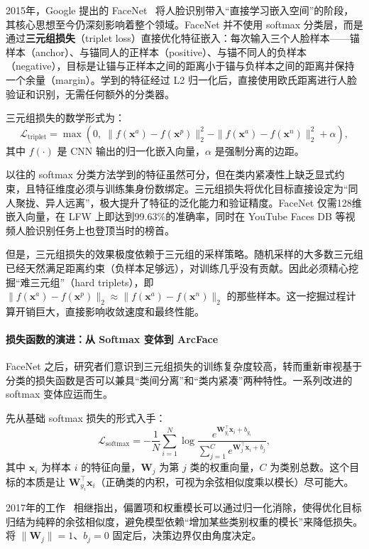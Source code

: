 2015年，Google 提出的 FaceNet~\cite{Schroff_2015} 将人脸识别带入“直接学习嵌入空间”的阶段，其核心思想至今仍深刻影响着整个领域。FaceNet 并不使用 softmax 分类层，而是通过\textbf{三元组损失}（triplet loss）直接优化特征嵌入：每次输入三个人脸样本——锚样本（anchor）、与锚同人的正样本（positive）、与锚不同人的负样本（negative），目标是让锚与正样本之间的距离小于锚与负样本之间的距离并保持一个余量（margin）。学到的特征经过 L2 归一化后，直接使用欧氏距离进行人脸验证和识别，无需任何额外的分类器。

三元组损失的数学形式为：
\[
\mathcal{L}_{\text{triplet}} = \max\left(0,\; \|f(\mathbf{x}^a) - f(\mathbf{x}^p)\|_2^2 - \|f(\mathbf{x}^a) - f(\mathbf{x}^n)\|_2^2 + \alpha\right),
\]
其中 $f(\cdot)$ 是 CNN 输出的归一化嵌入向量，$\alpha$ 是强制分离的边距。

以往的 softmax 分类方法学到的特征虽然可分，但在类内紧凑性上缺乏显式约束，且特征维度必须与训练集身份数绑定。三元组损失将优化目标直接设定为“同人聚拢、异人远离”，极大提升了特征的泛化能力和验证精度。FaceNet 仅需128维嵌入向量，在 LFW 上即达到99.63\%的准确率，同时在 YouTube Faces DB 等视频人脸识别任务上也登顶当时的榜首。

但是，三元组损失的效果极度依赖于三元组的采样策略。随机采样的大多数三元组已经天然满足距离约束（负样本足够远），对训练几乎没有贡献。因此必须精心挖掘“难三元组”（hard triplets），即 $\|f(\mathbf{x}^a)-f(\mathbf{x}^p)\|_2 \approx \|f(\mathbf{x}^a)-f(\mathbf{x}^n)\|_2$ 的那些样本。这一挖掘过程计算开销巨大，直接影响收敛速度和最终性能。

\paragraph{损失函数的演进：从 Softmax 变体到 ArcFace}

FaceNet 之后，研究者们意识到三元组损失的训练复杂度较高，转而重新审视基于分类的损失函数是否可以兼具“类间分离”和“类内紧凑”两种特性。一系列改进的 softmax 变体应运而生。

先从基础 softmax 损失的形式入手：
\[
\mathcal{L}_{\text{softmax}} = -\frac{1}{N}\sum_{i=1}^N \log\frac{e^{\mathbf{W}_{y_i}^\top \mathbf{x}_i + b_{y_i}}}{\sum_{j=1}^C e^{\mathbf{W}_j^\top \mathbf{x}_i + b_j}},
\]
其中 $\mathbf{x}_i$ 为样本 $i$ 的特征向量，$\mathbf{W}_j$ 为第 $j$ 类的权重向量，$C$ 为类别总数。这个目标的本质是让 $\mathbf{W}_{y_i}^\top \mathbf{x}_i$（正确类的内积，可视为余弦相似度乘以模长）尽可能大。

2017年的工作~\cite{Wang_2017,wang2018cosfacelargemargincosine} 相继指出，偏置项和权重模长可以通过归一化消除，使得优化目标归结为纯粹的余弦相似度，避免模型依赖“增加某些类别权重的模长”来降低损失。将 $\|\mathbf{W}_j\|=1$、$b_j=0$ 固定后，决策边界仅由角度决定。

